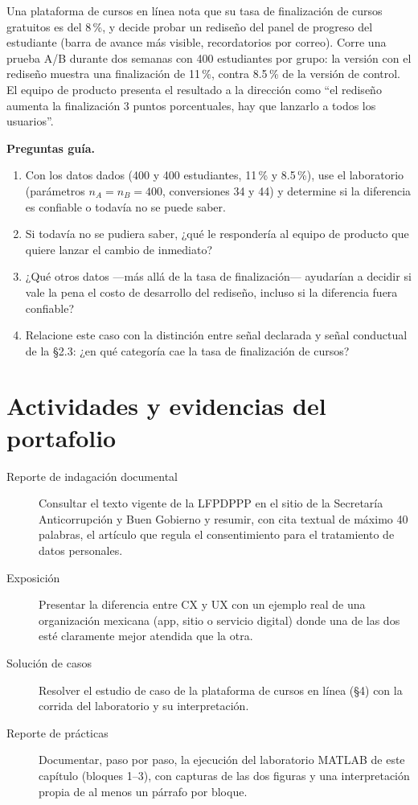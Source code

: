 \begin{casoFicticio}
Una plataforma de cursos en línea nota que su tasa de finalización de
cursos gratuitos es del 8\,\%, y decide probar un rediseño del panel de
progreso del estudiante (barra de avance más visible, recordatorios por
correo). Corre una prueba A/B durante dos semanas con 400 estudiantes por
grupo: la versión con el rediseño muestra una finalización de 11\,\%, contra
8.5\,\% de la versión de control. El equipo de producto presenta el
resultado a la dirección como \enquote{el rediseño aumenta la finalización 3
puntos porcentuales, hay que lanzarlo a todos los usuarios}.

\textbf{Preguntas guía.}
\begin{enumerate}
  \item Con los datos dados (400 y 400 estudiantes, 11\,\% y 8.5\,\%),
  use el laboratorio (parámetros $n_A=n_B=400$, conversiones 34 y 44) y
  determine si la diferencia es confiable o todavía no se puede saber.
  \item Si todavía no se pudiera saber, ¿qué le respondería al
  equipo de producto que quiere lanzar el cambio de inmediato?
  \item ¿Qué otros datos —más allá de la tasa de finalización— ayudarían a
  decidir si vale la pena el costo de desarrollo del rediseño, incluso si la
  diferencia fuera confiable?
  \item Relacione este caso con la distinción entre señal declarada y señal
  conductual de la §2.3: ¿en qué categoría cae la tasa de finalización de
  cursos?
\end{enumerate}
\end{casoFicticio}

\section{Actividades y evidencias del portafolio}

\begin{description}
  \item[Reporte de indagación documental] Consultar el texto vigente de la
  LFPDPPP en el sitio de la Secretaría Anticorrupción y Buen Gobierno y
  resumir, con cita textual de máximo 40 palabras, el artículo que regula el
  consentimiento para el tratamiento de datos personales.
  \item[Exposición] Presentar la diferencia entre CX y UX con un ejemplo real
  de una organización mexicana (app, sitio o servicio digital) donde una de
  las dos esté claramente mejor atendida que la otra.
  \item[Solución de casos] Resolver el estudio de caso de la plataforma de
  cursos en línea (§4) con la corrida del laboratorio y su interpretación.
  \item[Reporte de prácticas] Documentar, paso por paso, la ejecución del
  laboratorio MATLAB de este capítulo (bloques 1--3), con capturas de las
  dos figuras y una interpretación propia de al menos un párrafo por bloque.
\end{description}

